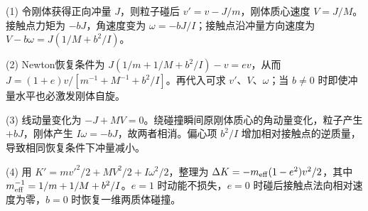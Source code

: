(1) 令刚体获得正向冲量 \(J\)，则粒子碰后 \(v'=v-J/m\)，刚体质心速度 \(V=J/M\)。接触点力矩为 \(-bJ\)，角速度变为 \(\omega=-bJ/I\)；接触点沿冲量方向速度为 \(V-b\omega=J(1/M+b^2/I)\)。

(2) Newton恢复条件为 \(J(1/m+1/M+b^2/I)-v=ev\)，从而 \(J=(1+e)v/[m^{-1}+M^{-1}+b^2/I]\)。再代入可求 \(v'、V、\omega\)；当 \(b\ne0\) 时即使冲量水平也必激发刚体自旋。

(3) 线动量变化为 \(-J+MV=0\)。绕碰撞瞬间原刚体质心的角动量变化，粒子产生 \(+bJ\)，刚体产生 \(I\omega=-bJ\)，故两者相消。偏心项 \(b^2/I\) 增加相对接触点的逆质量，导致相同恢复条件下冲量减小。

(4) 用 \(K'=mv'^2/2+MV^2/2+I\omega^2/2\)，整理为 \(\Delta K=-m_{\rm eff}(1-e^2)v^2/2\)，其中 \(m_{\rm eff}^{-1}=1/m+1/M+b^2/I\)。\(e=1\) 时动能不损失，\(e=0\) 时碰后接触点法向相对速度为零，\(b=0\) 时恢复一维两质体碰撞。
